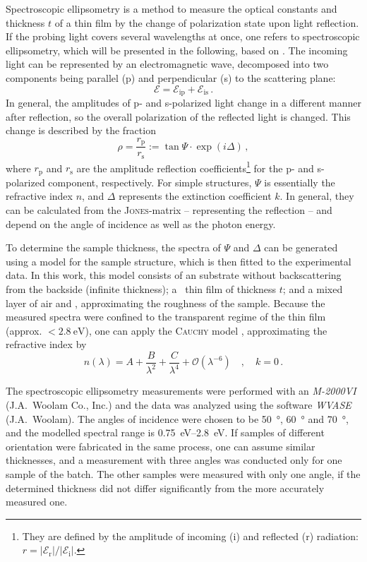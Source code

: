 Spectroscopic ellipsometry is a method to measure the optical constants and thickness $t$ of a thin film by the change of polarization state upon light reflection.
If the probing light covers several wavelengths at once, one refers to spectroscopic ellipsometry, which will be presented in the following, based on \textcite{fujiwara2007}.
The incoming light can be represented by an electromagnetic wave, decomposed into two components being parallel (p) and perpendicular (s) to the scattering plane:
\begin{equation}
    \mathcal{E} = \mathcal{E}_\mathrm{ip} + \mathcal{E}_\mathrm{is}\,.
\end{equation}
In general, the amplitudes of p- and s-polarized light change in a different manner after reflection, so the overall polarization of the reflected light is changed.
This change is described by the fraction
\begin{equation}
    \rho=\frac{r_\mathrm{p}}{r_\mathrm{s}}:=\tan\Psi\cdot\exp(i\Delta)\,,
\end{equation}
where $r_\mathrm{p}$ and $r_\mathrm{s}$ are the amplitude reflection coefficients\footnote{
    They are defined by the amplitude of incoming (i) and reflected (r) radiation: $r=|\mathcal{E}_\mathrm{r}|/|\mathcal{E}_\mathrm{i}|$.
} for the p- and s-polarized component, respectively.
For simple structures, $\Psi$ is essentially the refractive index $n$, and $\Delta$ represents the extinction coefficient $k$.
In general, they can be calculated from the \textsc{Jones}-matrix -- representing the reflection -- and depend on the angle of incidence as well as the photon energy.

To determine the sample thickness, the spectra of $\Psi$ and $\Delta$ can be generated using a model for the sample structure, which is then fitted to the experimental data.
In this work, this model consists of an  substrate without backscattering from the backside (infinite thickness); a \cro\ thin film of thickness $t$; and a mixed layer of air and \cro, approximating the roughness of the sample.
Because the measured spectra were confined to the transparent regime of the thin film (approx. $<\qty{2.8}{\eV}$), one can apply the \textsc{Cauchy} model
    \cite{fujiwara2007},
approximating the refractive index by
\begin{equation}
    n(\lambda)=A+\frac{B}{\lambda^2}+\frac{C}{\lambda^4}+\mathcal{O}\left(\lambda^{-6}\right)\quad,\quad k=0\,.
\end{equation}

The spectroscopic ellipsometry measurements were performed with an \textit{M-2000VI} (J.A.\ Woolam Co., Inc.) and the data was analyzed using the software \textit{WVASE} (J.A.\ Woolam).
The angles of incidence were chosen to be \qty{50}{\degree}, \qty{60}{\degree} and \qty{70}{\degree}, and the modelled spectral range is \qtyrange{0.75}{2.8}{\eV}.
If samples of different orientation were fabricated in the same process, one can assume similar thicknesses, and a measurement with three angles was conducted only for one sample of the batch.
The other samples were measured with only one angle, if the determined thickness did not differ significantly from the more accurately measured one.


